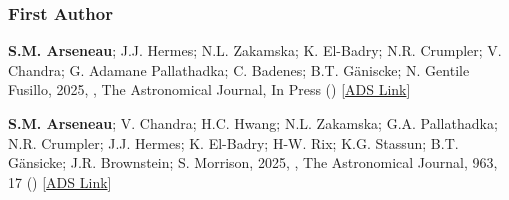 \documentclass[12pt,letterpaper]{article}
\begin{document}
\subsubsection{First Author}
\begin{list}{}{\cvlist}
  \item[{\color{numcolor}\scriptsize2}] \textbf{S.M. Arseneau}; J.J. Hermes; N.L. Zakamska; K. El-Badry; N.R. Crumpler; V. Chandra; G. Adamane Pallathadka; C. Badenes; B.T. G\"aniscke; N. Gentile Fusillo, 2025, , The Astronomical Journal, In Press () [\href{https://ui.adsabs.harvard.edu/abs/2025arXiv250804775A}{ADS Link}]
  \item[{\color{numcolor}\scriptsize1}] \textbf{S.M. Arseneau}; V. Chandra; H.C. Hwang; N.L. Zakamska; G.A. Pallathadka; N.R. Crumpler; J.J. Hermes; K. El-Badry; H-W. Rix; K.G. Stassun; B.T. G\"ansicke; J.R. Brownstein; S. Morrison, 2025, , The Astronomical Journal, 963, 17 () [\href{https://ui.adsabs.harvard.edu/abs/2024ApJ...963...17A/abstract}{ADS Link}]
\end{list}
\end{document}
